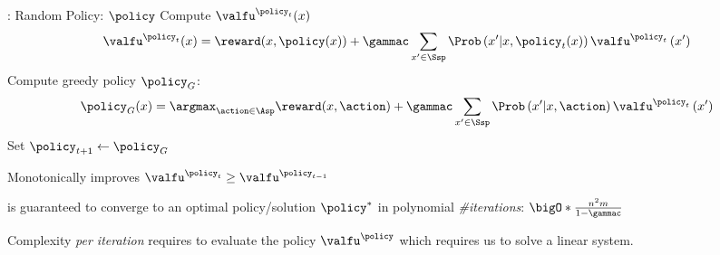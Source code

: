 \begin{algorithmbox}\nospacing
  \begin{algo}\label{algorithm:policy_iteration}\leavevmode
    \begin{algorithmic}[1]
      \item[] : Random Policy: $\policy$
        \State Compute $\valfu^{\policy_{t}}(x)$
        \begin{align*}
          \valfu^{\policy_{t}}(x)=
          \reward(x,\policy(x))+\gammac\sum_{x'\in\Ssp}\Prob\left(x'|x,\policy_{t}(x)\right)\valfu^{\policy_{t}}\left(x'\right)
        \end{align*}
        \State Compute greedy policy $\policy_{G}$:
        \begin{align*}
          \policy_{G}(x)=\argmax_{\action\in\Asp}
          \reward(x,\action)+\gammac\sum_{x'\in\Ssp}\Prob\left(x'|x,\action\right)\valfu^{\policy_{t}}\left(x'\right)
        \end{align*}
        \State Set $\policy_{t+1}\leftarrow\policy_{G}$
        \EndWhile
    \end{algorithmic}
  \end{algo}
\end{algorithmbox}
\begin{sectionbox}\nospacing
 \begin{proslist}
      \item Monotonically improves $\valfu^{\policy_{t}}\geq\valfu^{\policy_{t-1}}$
      \item is guaranteed to converge to an optimal policy/solution $\policy^{*}$ in
      polynomial \textit{\#iterations}: $\bigO*{\frac{n^{2}m}{1-\gammac}}$
 \end{proslist}
 \begin{conslist}
   \item Complexity \textit{per iteration} requires to evaluate the policy $\valfu^{\policy}$ which
   requires us to solve a linear system.
 \end{conslist}
\end{sectionbox}
